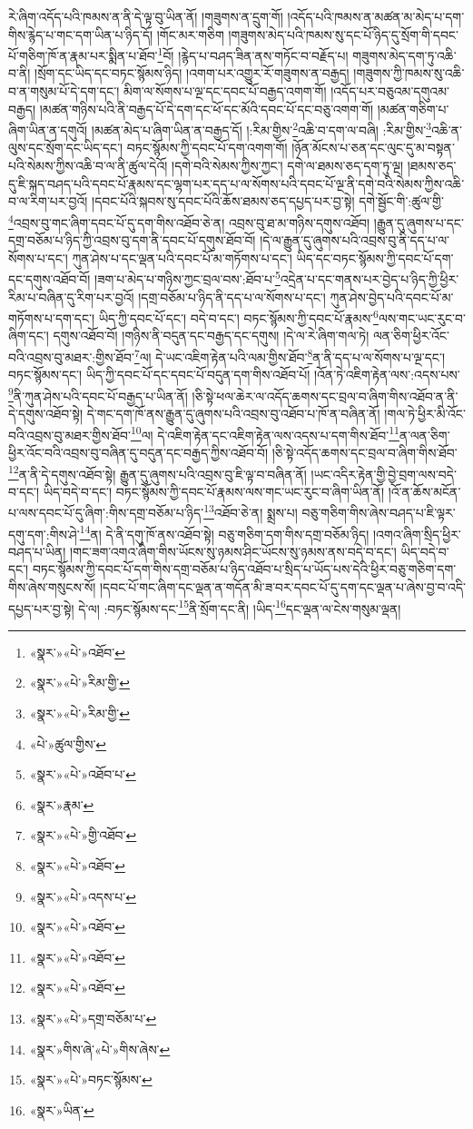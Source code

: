 རེ་ཞིག་འདོད་པའི་ཁམས་ན་ནི་དེ་ལྟ་བུ་ཡིན་ནོ། །གཟུགས་ན་དྲུག་གོ། །འདོད་པའི་ཁམས་ན་མཚན་མ་མེད་པ་དག་གིས་རྙེད་པ་གང་དག་ཡིན་པ་ཉིད་དོ། །གོང་མར་གཅིག །གཟུགས་མེད་པའི་ཁམས་སུ་དང་པོ་ཉིད་དུ་སྲོག་གི་དབང་པོ་གཅིག་ཁོ་ན་རྣམ་པར་སྨིན་པ་ཐོབ་\footnote{«སྣར་»«པེ་»འཐོབ་}བོ། །རྙེད་པ་བཤད་ཟིན་ནས་གཏོང་བ་བརྗོད་པ། གཟུགས་མེད་དག་ཏུ་འཆི་བ་ནི། །སྲོག་དང་ཡིད་དང་བཏང་སྙོམས་ཉིད། །འགག་པར་འགྱུར་རོ་གཟུགས་ན་བརྒྱད། །གཟུགས་ཀྱི་ཁམས་སུ་འཆི་བ་ན་གསུམ་པོ་དེ་དག་དང་། མིག་ལ་སོགས་པ་ལྔ་དང་དབང་པོ་བརྒྱད་འགག་གོ། །འདོད་པར་བཅུའམ་དགུའམ་བརྒྱད། །མཚན་གཉིས་པའི་ནི་བརྒྱད་པོ་དེ་དག་དང་ཕོ་དང་མོའི་དབང་པོ་དང་བཅུ་འགག་གོ། །མཚན་གཅིག་པ་ཞིག་ཡིན་ན་དགུའོ། །མཚན་མེད་པ་ཞིག་ཡིན་ན་བརྒྱད་དོ། །:རིམ་གྱིས་\footnote{«སྣར་»«པེ་»རིམ་གྱི་}འཆི་བ་དག་ལ་བཞི། :རིམ་གྱིས་\footnote{«སྣར་»«པེ་»རིམ་གྱི་}འཆི་ན་ལུས་དང་སྲོག་དང་ཡིད་དང་། བཏང་སྙོམས་ཀྱི་དབང་པོ་དག་འགག་གོ། །ཉོན་མོངས་པ་ཅན་དང་ལུང་དུ་མ་བསྟན་པའི་སེམས་ཀྱིས་འཆི་བ་ལ་ནི་ཚུལ་དེའོ། །དགེ་བའི་སེམས་ཀྱིས་ཀྱང་། དགེ་ལ་ཐམས་ཅད་དག་ཏུ་ལྔ། །ཐམས་ཅད་དུ་ཇི་སྐད་བཤད་པའི་དབང་པོ་རྣམས་དང་ལྷག་པར་དད་པ་ལ་སོགས་པའི་དབང་པོ་ལྔ་ནི་དགེ་བའི་སེམས་ཀྱིས་འཆི་བ་ལ་རིག་པར་བྱའོ། །དབང་པོའི་སྐབས་སུ་དབང་པོའི་ཆོས་ཐམས་ཅད་དཔྱད་པར་བྱ་སྟེ། དགེ་སྦྱོང་གི་:ཚུལ་གྱི་\footnote{«པེ་»ཚུལ་གྱིས་}འབྲས་བུ་གང་ཞིག་དབང་པོ་དུ་དག་གིས་འཐོབ་ཅེ་ན། འབྲས་བུ་ཐ་མ་གཉིས་དགུས་འཐོབ། །རྒྱུན་དུ་ཞུགས་པ་དང་དགྲ་བཅོམ་པ་ཉིད་ཀྱི་འབྲས་བུ་དག་ནི་དབང་པོ་དགུས་ཐོབ་བོ། །དེ་ལ་རྒྱུན་དུ་ཞུགས་པའི་འབྲས་བུ་ནི་དད་པ་ལ་སོགས་པ་དང་། ཀུན་ཤེས་པ་དང་ལྡན་པའི་དབང་པོ་མ་གཏོགས་པ་དང་། ཡིད་དང་བཏང་སྙོམས་ཀྱི་དབང་པོ་དག་དང་དགུས་འཐོབ་བོ། །ཟག་པ་མེད་པ་གཉིས་ཀྱང་བྲལ་བས་:ཐོབ་པ་\footnote{«སྣར་»«པེ་»འཐོབ་པ་}འདྲེན་པ་དང་གནས་པར་བྱེད་པ་ཉིད་ཀྱི་ཕྱིར་རིམ་པ་བཞིན་དུ་རིག་པར་བྱའོ། །དགྲ་བཅོམ་པ་ཉིད་ནི་དད་པ་ལ་སོགས་པ་དང་། ཀུན་ཤེས་བྱེད་པའི་དབང་པོ་མ་གཏོགས་པ་དག་དང་། ཡིད་ཀྱི་དབང་པོ་དང་། བདེ་བ་དང་། བཏང་སྙོམས་ཀྱི་དབང་པོ་རྣམས་\footnote{«སྣར་»རྣམ་}ལས་གང་ཡང་རུང་བ་ཞིག་དང་། དགུས་འཐོབ་བོ། །གཉིས་ནི་བདུན་དང་བརྒྱད་དང་དགུས། །དེ་ལ་རེ་ཞིག་གལ་ཏེ། ལན་ཅིག་ཕྱིར་འོང་བའི་འབྲས་བུ་མཐར་:གྱིས་ཐོབ་\footnote{«སྣར་»«པེ་»གྱི་འཐོབ་}ལ། དེ་ཡང་འཇིག་རྟེན་པའི་ལམ་གྱིས་ཐོབ་\footnote{«སྣར་»«པེ་»འཐོབ་}ན་ནི་དད་པ་ལ་སོགས་པ་ལྔ་དང་། བཏང་སྙོམས་དང་། ཡིད་ཀྱི་དབང་པོ་དང་དབང་པོ་བདུན་དག་གིས་འཐོབ་པོ། །འོན་ཏེ་འཇིག་རྟེན་ལས་:འདས་པས་\footnote{«སྣར་»«པེ་»འདས་པ་}ནི་ཀུན་ཤེས་པའི་དབང་པོ་བརྒྱད་པ་ཡིན་ནོ། །ཅི་སྟེ་ཕལ་ཆེར་ལ་འདོད་ཆགས་དང་བྲལ་བ་ཞིག་གིས་འཐོབ་ན་ནི་དེ་དགུས་འཐོབ་སྟེ། དེ་གང་དག་ཁོ་ནས་རྒྱུན་དུ་ཞུགས་པའི་འབྲས་བུ་འཐོབ་པ་ཁོ་ན་བཞིན་ནོ། །གལ་ཏེ་ཕྱིར་མི་འོང་བའི་འབྲས་བུ་མཐར་གྱིས་ཐོབ་\footnote{«སྣར་»«པེ་»འཐོབ་}ལ། དེ་འཇིག་རྟེན་དང་འཇིག་རྟེན་ལས་འདས་པ་དག་གིས་ཐོབ་\footnote{«སྣར་»«པེ་»འཐོབ་}ན་ལན་ཅིག་ཕྱིར་འོང་བའི་འབྲས་བུ་བཞིན་དུ་བདུན་དང་བརྒྱད་ཀྱིས་འཐོབ་བོ། །ཅི་སྟེ་འདོད་ཆགས་དང་བྲལ་བ་ཞིག་གིས་ཐོབ་\footnote{«སྣར་»«པེ་»འཐོབ་}ན་ནི་དེ་དགུས་འཐོབ་སྟེ། རྒྱུན་དུ་ཞུགས་པའི་འབྲས་བུ་ཇི་ལྟ་བ་བཞིན་ནོ། །ཡང་འདིར་རྟེན་གྱི་བྱེ་བྲག་ལས་བདེ་བ་དང་། ཡིད་བདེ་བ་དང་། བཏང་སྙོམས་ཀྱི་དབང་པོ་རྣམས་ལས་གང་ཡང་རུང་བ་ཞིག་ཡིན་ནོ། །འོ་ན་ཆོས་མངོན་པ་ལས་དབང་པོ་དུ་ཞིག་:གིས་དགྲ་བཅོམ་པ་ཉིད་\footnote{«སྣར་»«པེ་»དགྲ་བཅོམ་པ་}འཐོབ་ཅེ་ན། སྨྲས་པ། བཅུ་གཅིག་གིས་ཞེས་བཤད་པ་ཇི་ལྟར་དགུ་དག་:གིས་ཤེ་\footnote{«སྣར་»གིས་ཞེ་«པེ་»གིས་ཞེས་}ན། དེ་ནི་དགུ་ཁོ་ནས་འཐོབ་སྟེ། བཅུ་གཅིག་དག་གིས་དགྲ་བཅོམ་ཉིད། །འགའ་ཞིག་སྲིད་ཕྱིར་བཤད་པ་ཡིན། །གང་ཟག་འགའ་ཞིག་གིས་ཡོངས་སུ་ཉམས་ཤིང་ཡོངས་སུ་ཉམས་ནས་བདེ་བ་དང་། ཡིད་བདེ་བ་དང་། བཏང་སྙོམས་ཀྱི་དབང་པོ་དག་གིས་དགྲ་བཅོམ་པ་ཉིད་འཐོབ་པ་སྲིད་པ་ཡོད་པས་དེའི་ཕྱིར་བཅུ་གཅིག་དག་གིས་ཞེས་གསུངས་སོ། །དབང་པོ་གང་ཞིག་དང་ལྡན་ན་གདོན་མི་ཟ་བར་དབང་པོ་དུ་དག་དང་ལྡན་པ་ཞེས་བྱ་བ་འདི་དཔྱད་པར་བྱ་སྟེ། དེ་ལ། :བཏང་སྙོམས་དང་\footnote{«སྣར་»«པེ་»བཏང་སྙོམས་}ནི་སྲོག་དང་ནི། །ཡིད་\footnote{«སྣར་»ཡིན་}དང་ལྡན་ལ་ངེས་གསུམ་ལྡན། 